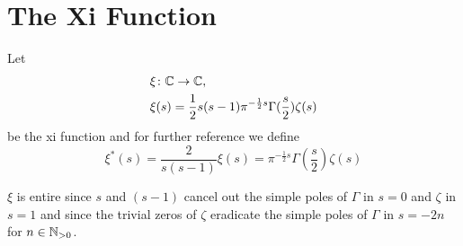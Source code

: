 \section{The Xi Function}


\begin{definition}\label{def:XiDefinition}
	Let
\begin{equation*}
\begin{aligned}
	&\xi \colon \mathbb{C} \to \mathbb{C}, \\
	&\xi(s) = \frac{1}{2}s(s - 1) \pi ^{-\frac{1}{2} s} \Gamma(\frac{s}{2}) \zeta(s)
\end{aligned}
\end{equation*}
	be the xi function and for further reference we define
\begin{equation*}
	\xi^*(s) = \frac{2}{s(s - 1)} \xi(s) = \pi ^{-\frac{1}{2} s} \Gamma(\frac{s}{2}) \zeta(s)
\end{equation*}
\end{definition}


\begin{remark}
	$\xi$ is entire since $s$ and $(s - 1)$ cancel out the simple poles of $\Gamma$ in $s = 0$ and $\zeta$ in $s = 1$ and since the trivial zeros of $\zeta$ eradicate the simple poles of $\Gamma$ in $s = -2n$ for $n \in \mathbb{N}_{> 0}$.
\end{remark}


